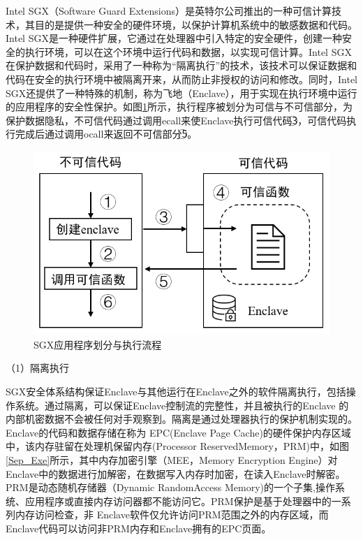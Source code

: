
Intel SGX（Software Guard Extensions）是英特尔公司推出的一种可信计算技术，其目的是提供一种安全的硬件环境，以保护计算机系统中的敏感数据和代码。Intel SGX是一种硬件扩展，它通过在处理器中引入特定的安全硬件，创建一种安全的执行环境，可以在这个环境中运行代码和数据，以实现可信计算。Intel SGX在保护数据和代码时，采用了一种称为“隔离执行”的技术，该技术可以保证数据和代码在安全的执行环境中被隔离开来，从而防止非授权的访问和修改。同时，Intel SGX还提供了一种特殊的机制，称为飞地（Enclave），用于实现在执行环境中运行的应用程序的安全性保护。如图\ref{SGX_Program}所示，执行程序被划分为可信与不可信部分，为保护数据隐私，不可信代码通过调用ecall来使Enclave执行可信代码\textcircled{3}，可信代码执行完成后通过调用ocall来返回不可信部分\textcircled{5}。

\begin{figure}[h]
	\centering
	\includegraphics[width=0.5\linewidth]{figures/SGX_Program.png}
	\caption{SGX应用程序划分与执行流程}
	\label{SGX_Program}
\end{figure}

（1）隔离执行

SGX安全体系结构保证Enclave与其他运行在Enclave之外的软件隔离执行，包括操作系统。通过隔离，可以保证Enclave控制流的完整性，并且被执行的Enclave 的内部机密数据不会被任何对手观察到。隔离是通过处理器执行的保护机制实现的。Enclave的代码和数据存储在称为 EPC(Enclave Page Cache)的硬件保护内存区域中，该内存驻留在处理机保留内存(Processor ReservedMemory，PRM)中，如图\ref{Sep_Exe}所示，其中内存加密引擎（MEE，Memory Encryption Engine）对Enclave中的数据进行加解密，在数据写入内存时加密，在读入Enclave时解密。PRM是动态随机存储器（Dynamic RandomAccess Memory)的一个子集,操作系统、应用程序或直接内存访问器都不能访问它。PRM保护是基于处理器中的一系列内存访问检查，非 Enclave软件仅允许访问PRM范围之外的内存区域，而Enclave代码可以访问非PRM内存和Enclave拥有的EPC页面。

